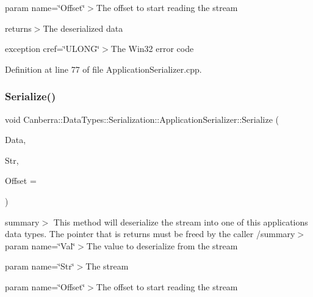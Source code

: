 param name=\char`\"{}\+Offset\char`\"{}$>$The offset to start reading the stream

returns$>$The deserialized data

exception cref=\char`\"{}\+U\+L\+O\+N\+G\char`\"{}$>$The Win32 error code

Definition at line 77 of file Application\+Serializer.\+cpp.

\mbox{\label{class_canberra_1_1_data_types_1_1_serialization_1_1_application_serializer_aa0e18d74f0a1fad87295808182febf52_aa0e18d74f0a1fad87295808182febf52}} 
\subsubsection{\texorpdfstring{Serialize()}{Serialize()}\hspace{0.1cm}{\footnotesize\ttfamily [1/2]}}
{\footnotesize\ttfamily void Canberra\+::\+Data\+Types\+::\+Serialization\+::\+Application\+Serializer\+::\+Serialize (\begin{DoxyParamCaption}\item[{\hyperlink{class_canberra_1_1_serialization_1_1_serializable_object}{Canberra\+::\+Serialization\+::\+Serializable\+Object} $\ast$}]{Data,  }\item[{\hyperlink{class_canberra_1_1_utility_1_1_core_1_1_byte_stream}{Canberra\+::\+Utility\+::\+Core\+::\+Byte\+Stream} \&}]{Str,  }\item[{const L\+O\+NG}]{Offset = {} }\end{DoxyParamCaption})\hspace{0.3cm}{\ttfamily [virtual]}}

summary$>$ This method will deserialize the stream into one of this applications data types. The pointer that is returns must be free\textquotesingle{}d by the caller /summary$>$ param name=\char`\"{}\+Val\char`\"{}$>$The value to deserialize from the stream

param name=\char`\"{}\+Str\char`\"{}$>$The stream

param name=\char`\"{}\+Offset\char`\"{}$>$The offset to start reading the stream

